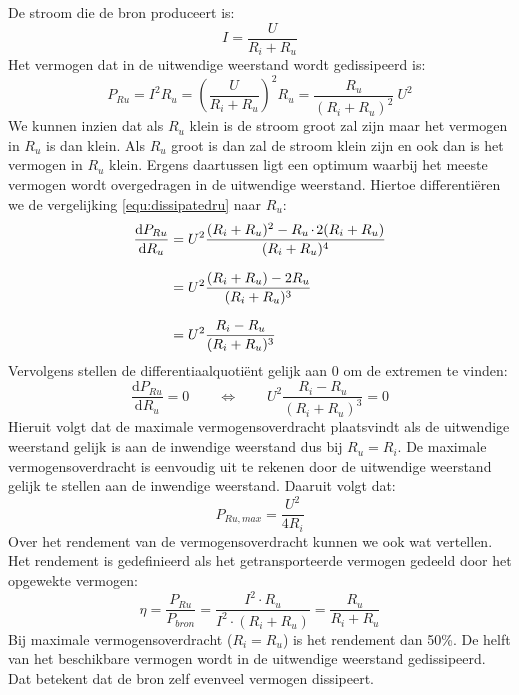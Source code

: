 De stroom die de bron produceert is:
%
\begin{equation}
I = \dfrac{U}{R_i + R_u}
\end{equation}
%
Het vermogen dat in de uitwendige weerstand wordt gedissipeerd is:
%
\begin{equation}
\label{equ:dissipatedru}
P_{Ru} = I^2R_u = \left(\dfrac{U}{R_i+R_u}\right)^2 R_u
       = \dfrac{R_u}{(R_i+R_u)^2}\: U^2
\end{equation}
%
We kunnen inzien dat als $R_u$ klein is de stroom groot zal zijn maar het vermogen in $R_u$ is
dan klein. Als $R_u$ groot is dan zal de stroom klein zijn en ook dan is het
vermogen in $R_u$ klein. Ergens daartussen ligt een optimum waarbij het meeste vermogen
wordt overgedragen in de uitwendige weerstand. Hiertoe differenti\"eren we de vergelijking
\eqref{equ:dissipatedru} naar $R_u$:
%
\begin{equation}
\setlength{\jot}{10pt}
\begin{split}
\dfrac{\text{d}P_{Ru}}{\text{d}R_u} &= U^2\dfrac{(R_i+R_u)^2-R_u\cdot2(R_i+R_u)}{(R_i+R_u)^4} \\
      &= U^2 \dfrac{(R_i+R_u)-2R_u}{(R_i+R_u)^3} \\
      &= U^2 \dfrac{R_i-R_u}{(R_i+R_u)^3}
\end{split}
\end{equation}
%
Vervolgens stellen de differentiaalquoti\"ent gelijk aan 0 om de extremen te vinden:
%
\begin{equation}
\dfrac{\text{d}P_{Ru}}{\text{d}R_u} = 0 \qquad \Longleftrightarrow \qquad U^2 \dfrac{R_i-R_u}{(R_i+R_u)^3} = 0
\end{equation}
%
Hieruit volgt dat de maximale vermogensoverdracht plaatsvindt als de uitwendige
weerstand gelijk is aan de inwendige weerstand dus bij $R_u=R_i$. De maximale
vermogensoverdracht is eenvoudig uit te rekenen door de uitwendige weerstand
gelijk te stellen aan de inwendige weerstand. Daaruit volgt dat:
%
\begin{equation}
P_{Ru,max} = \dfrac{U^2}{4R_i}
\end{equation}
%
Over het rendement van de vermogensoverdracht kunnen we ook wat vertellen. Het rendement is gedefinieerd
als het getransporteerde vermogen gedeeld door het opgewekte vermogen:
%
\begin{equation}
\eta = \dfrac{P_{Ru}}{P_{bron}} = \dfrac{I^2\cdot R_u}{I^2\cdot(R_i+R_u)} = \dfrac{R_u}{R_i+R_u}
\end{equation}
%
Bij maximale vermogensoverdracht ($R_i=R_u$) is het rendement dan 50\%. De helft van het beschikbare
vermogen wordt in de uitwendige weerstand gedissipeerd. Dat betekent dat de bron zelf evenveel vermogen
dissipeert.


